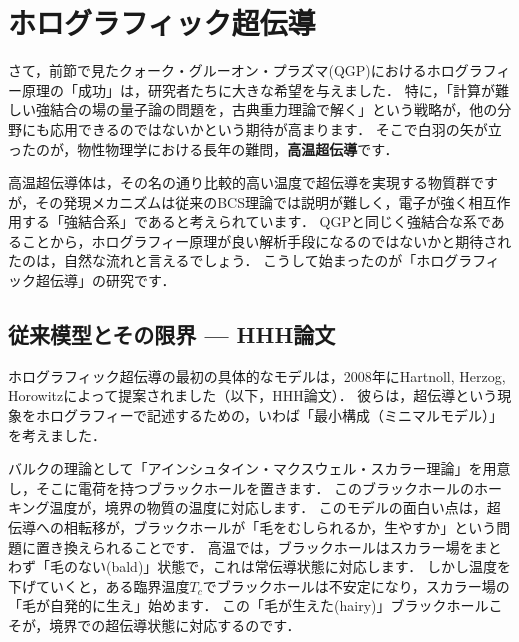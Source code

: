 \documentclass[b5paper,11pt,dvipdfmx]{jsarticle}
\numberwithin{equation}{section}
\theoremstyle{definition}
\begin{document}
\clearpage








\section{ホログラフィック超伝導}

さて，前節で見たクォーク・グルーオン・プラズマ(QGP)におけるホログラフィー原理の「成功」は，研究者たちに大きな希望を与えました．
特に，「計算が難しい強結合の場の量子論の問題を，古典重力理論で解く」という戦略が，他の分野にも応用できるのではないかという期待が高まります．
そこで白羽の矢が立ったのが，物性物理学における長年の難問，\textbf{高温超伝導}です．

高温超伝導体は，その名の通り比較的高い温度で超伝導を実現する物質群ですが，その発現メカニズムは従来のBCS理論では説明が難しく，電子が強く相互作用する「強結合系」であると考えられています．
QGPと同じく強結合な系であることから，ホログラフィー原理が良い解析手段になるのではないかと期待されたのは，自然な流れと言えるでしょう．
こうして始まったのが「ホログラフィック超伝導」の研究です．

\subsection{従来模型とその限界 --- HHH論文}

ホログラフィック超伝導の最初の具体的なモデルは，2008年にHartnoll, Herzog, Horowitzによって提案されました\cite{Hartnoll08a, Hartnoll08b}（以下，HHH論文）．
彼らは，超伝導という現象をホログラフィーで記述するための，いわば「最小構成（ミニマルモデル）」を考えました．

バルクの理論として「アインシュタイン・マクスウェル・スカラー理論」を用意し，そこに電荷を持つブラックホールを置きます．
このブラックホールのホーキング温度が，境界の物質の温度に対応します．
このモデルの面白い点は，超伝導への相転移が，ブラックホールが「毛をむしられるか，生やすか」という問題に置き換えられることです．
高温では，ブラックホールはスカラー場をまとわず「毛のない(bald)」状態で，これは常伝導状態に対応します．
しかし温度を下げていくと，ある臨界温度$T_c$でブラックホールは不安定になり，スカラー場の「毛が自発的に生え」始めます．
この「毛が生えた(hairy)」ブラックホールこそが，境界での超伝導状態に対応するのです．
\end{document}
